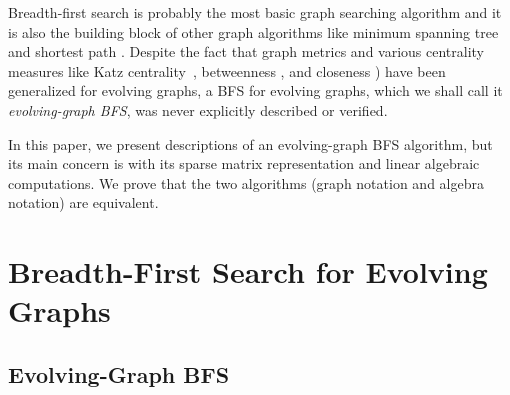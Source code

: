 \documentclass[11pt,conference,compsocconf]{IEEEtran}
\theoremstyle{definition}
\begin{document}
Breadth-first search is probably the most basic graph searching algorithm and
it is also the building block of other graph algorithms like minimum spanning tree
and shortest path \cite{ckrs09}.
Despite the fact that graph metrics \cite{ntmm13,tmml09,tsmm09} and
various centrality measures like Katz centrality~\cite{gphe11,grihig13},
betweenness \cite{alhi15}, and closeness \cite{tmml10})
have been generalized for evolving graphs,
a BFS for evolving graphs, which we shall call it \emph{evolving-graph BFS},
was never explicitly described or verified.


In this paper,  we present descriptions of an evolving-graph BFS algorithm, but its main concern is with its sparse matrix
representation and linear algebraic computations.
We prove that the two algorithms (graph notation and algebra notation) are equivalent.



\section{Breadth-First Search for Evolving Graphs}
\label{sec:breadth-first-search}

\subsection{Evolving-Graph BFS}
\label{sec:evolving-graph-bfs}
\end{document}
